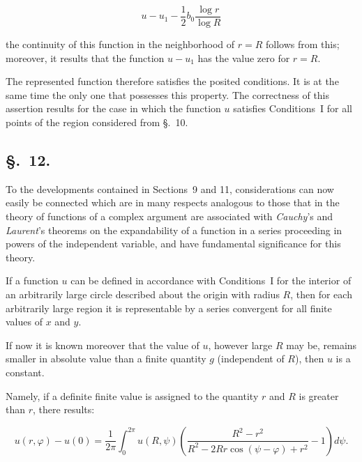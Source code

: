 \documentclass{article}
\begin{document}

\[

u - u_1 - \frac{1}{2} b_0 \frac{\log r}{\log R}

\]

the continuity of this function in the neighborhood of $r = R$ follows from this; moreover, it results that the function $u - u_1$ has the value zero for $r = R$.



The represented function therefore satisfies the posited conditions. It is at the same time the only one that possesses this property. The correctness of this assertion results for the case in which the function $u$ satisfies Conditions~I for all points of the region considered from §.~10.



\subsection*{§.~12.}



To the developments contained in Sections~9 and 11, considerations can now easily be connected which are in many respects analogous to those that in the theory of functions of a complex argument are associated with \emph{Cauchy}'s and \emph{Laurent}'s theorems on the expandability of a function in a series proceeding in powers of the independent variable, and have fundamental significance for this theory.



If a function $u$ can be defined in accordance with Conditions~I for the interior of an arbitrarily large circle described about the origin with radius $R$, then for each arbitrarily large region it is representable by a series convergent for all finite values of $x$ and $y$.



If now it is known moreover that the value of $u$, however large $R$ may be, remains smaller in absolute value than a finite quantity $g$ (independent of $R$), then $u$ is a constant.



Namely, if a definite finite value is assigned to the quantity $r$ and $R$ is greater than $r$, there results:

\[

u(r, \varphi) - u(0) = \frac{1}{2\pi} \int_0^{2\pi} u(R, \psi) \left(\frac{R^2 - r^2}{R^2 - 2Rr\cos(\psi - \varphi) + r^2} - 1\right) d\psi.

\]
\end{document}
